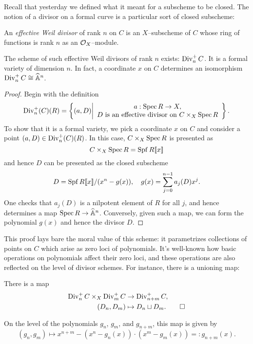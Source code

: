 Recall that yesterday we defined what it meant for a subscheme to be closed.    The notion of a divisor on a formal curve is a particular sort of closed subscheme:

\begin{definition}
An \textit{effective Weil divisor} of rank $n$ on $C$ is an $X$--subscheme of $C$ whose ring of functions is rank $n$ as an $\mathcal{O}_X$--module.
\end{definition}

\begin{lemma}
The scheme of such effective Weil divisors of rank $n$ exists: $\operatorname{Div}_n^+ C$.  It is a formal variety of dimension $n$.  In fact, a coordinate $x$ on $C$ determines an isomorphism $\operatorname{Div}_n^+ C \cong \widehat{\mathbb{A}}^n$.
\end{lemma}
\begin{proof}
Begin with the definition \[\operatorname{Div}_n^+(C)(R) = \left\{(a, D) \middle| \begin{array}{c} a: \operatorname{Spec} R \to X, \\ \text{$D$ is an effective divisor on $C \times_X \operatorname{Spec} R$} \end{array} \right\}.\]  To show that it is a formal variety, we pick a coordinate $x$ on $C$ and consider a point $(a, D) \in \operatorname{Div}_n^+(C)(R)$.  In this case, $C \times_X \operatorname{Spec} R$ is presented as \[C \times_X \operatorname{Spec} R = \operatorname{Spf} R\llbracket x \rrbracket\] and hence $D$ can be presented as the closed subscheme \[D = \operatorname{Spf} R\llbracket x \rrbracket / (x^n - g(x)), \quad g(x) = \sum_{j=0}^{n-1} a_j(D) x^j.\]  One checks that $a_j(D)$ is a nilpotent element of $R$ for all $j$, and hence determines a map $\operatorname{Spec} R \to \widehat{\mathbb{A}}^n$.  Conversely, given such a map, we can form the polynomial $g(x)$ and hence the divisor $D$.
\end{proof}

This proof lays bare the moral value of this scheme: it parametrizes collections of points on $C$ which arise as zero loci of polynomials.  It's well-known how basic operations on polynomials affect their zero loci, and these operations are also reflected on the level of divisor schemes.  For instance, there is a unioning map:
\begin{lemma}
There is a map
\begin{align*}
\operatorname{Div}_n^+ C \times_X \operatorname{Div}_m^+ C & \to \operatorname{Div}_{n+m}^+ C, \\
(D_n, D_m) & \mapsto D_n \sqcup D_m. \qed
\end{align*}
\end{lemma}
\begin{remark}\label{DescriptionOfSqCupMapOnPolynomials}
On the level of the polynomials $g_n$, $g_m$, and $g_{n+m}$, this map is given by \[(g_n, g_m) \mapsto x^{n+m} - (x^n - g_n(x)) \cdot (x^m - g_m(x)) =: g_{n+m}(x).\]
\end{remark}


